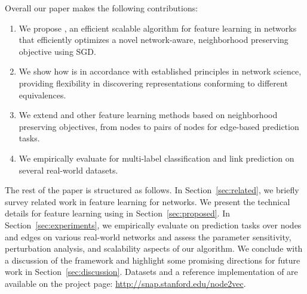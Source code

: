 
Overall our paper makes the following contributions:
\begin{enumerate}
	\item We propose \nodevec,  
	an efficient scalable algorithm for feature learning in networks that efficiently optimizes a novel network-aware, neighborhood preserving objective using SGD.
	\item We show how \nodevec is in accordance with established principles in network science, providing flexibility in discovering representations conforming to different equivalences.
	\item We extend \nodevec and other feature learning methods based on neighborhood preserving objectives, from nodes to pairs of nodes for edge-based prediction tasks.
	\item We empirically evaluate \nodevec for multi-label classification and link prediction on several real-world datasets.
\end{enumerate} 

The rest of the paper is structured as follows. In Section~\ref{sec:related}, we briefly survey related work in feature learning for networks. We present the technical details for feature learning using \nodevec in Section~\ref{sec:proposed}.
In Section~\ref{sec:experiments}, we empirically evaluate \nodevec on prediction tasks over nodes and edges on various real-world networks 
and assess the parameter sensitivity, perturbation analysis, and scalability aspects of our algorithm. 
We conclude with a discussion of the \nodevec framework and highlight some promising directions for future work in Section~\ref{sec:discussion}. Datasets and a reference implementation of \nodevec are available on the project page: \url{http://snap.stanford.edu/node2vec}.
